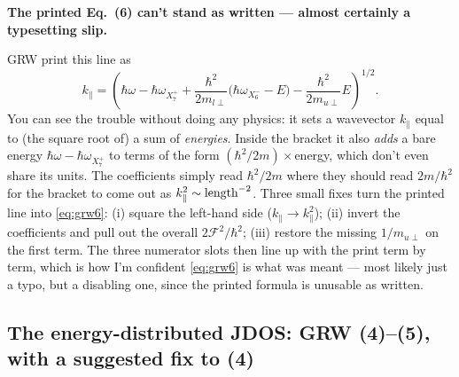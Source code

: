 \documentclass[11pt,a4paper]{article}
\newenvironment{printfix}[1]{%
  \begin{mdframed}[style=printfixstyle]%
  \noindent\textbf{\textcolor{BrickRed}{#1}}\par\smallskip\noindent\ignorespaces}%
  {\end{mdframed}}
\numberwithin{equation}{section}
\newcommand{\hw}{\hbar\omega}
\newcommand{\cF}{\mathcal{F}}
\newcommand{\kpar}{k_{\parallel}}
\newcommand{\wXsix}{\hbar\omega_{X_6^-}}
\newcommand{\wXseven}{\hbar\omega_{X_7^+}}
\begin{document}
\begin{printfix}{The printed Eq.~(6) can't stand as written --- almost
certainly a typesetting slip.}
GRW print this line as
\begin{equation*}
\kpar=\left(\hw-\wXseven
+\frac{\hbar^{2}}{2m_{l\perp}}\bigl(\wXsix-E\bigr)
-\frac{\hbar^{2}}{2m_{u\perp}}E\right)^{1/2}. \tag{6, as printed}
\end{equation*}
You can see the trouble without doing any physics: it sets a
wavevector $\kpar$ equal to (the square root of) a sum of
\emph{energies}. Inside the bracket it also \emph{adds} a bare energy
$\hw-\wXseven$ to terms of the form $(\hbar^2/2m)\times$energy, which
don't even share its units. The coefficients simply read $\hbar^2/2m$
where they should read $2m/\hbar^2$ for the bracket to come out as
$\kpar^2\sim{\rm length}^{-2}$. Three small fixes turn the printed
line into \eqref{eq:grw6}: (i) square the left-hand side
($\kpar\to\kpar^2$); (ii) invert the coefficients and pull out the
overall $2\cF^2/\hbar^2$; (iii) restore the missing $1/m_{u\perp}$ on
the first term. The three numerator slots then line up with the print
term by term, which is how I'm confident \eqref{eq:grw6} is what was
meant --- most likely just a typo, but a disabling one, since the
printed formula is unusable as written.
\end{printfix}

\subsection{The energy-distributed JDOS: GRW (4)--(5), with a suggested fix to (4)}
\end{document}
